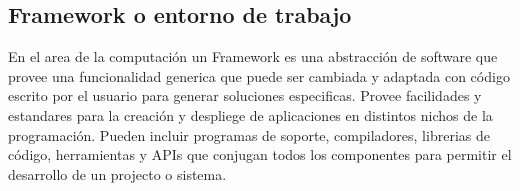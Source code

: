 \subsection{Framework o entorno de trabajo} 

En el area de la computación un Framework es una abstracción de software que provee una funcionalidad generica que puede ser cambiada y adaptada con código escrito por el usuario para generar soluciones especificas. Provee facilidades y estandares para la creación y despliege de aplicaciones en distintos nichos de la programación. Pueden incluir programas de soporte, compiladores, librerias de código, herramientas y APIs que conjugan todos los componentes para permitir el desarrollo de un projecto o sistema.


